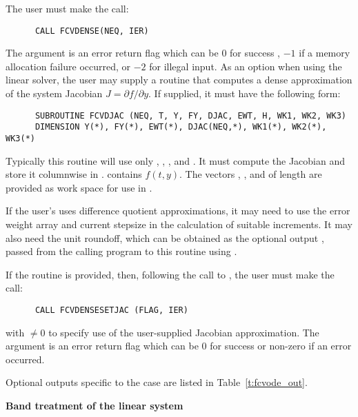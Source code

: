\begin{Steps}
  The user must make the call:
\begin{verbatim}
      CALL FCVDENSE(NEQ, IER)
\end{verbatim}
  The argument  is an error return flag which can be $0$ 
  for success , $-1$ if a memory allocation failure occurred, or $-2$ for illegal
  input.  
  As an option when using the {\dense} linear solver, the user may supply a
  routine that computes a dense approximation of the system Jacobian 
  $J = \partial f / \partial y$. If supplied, it must have the following form:
\begin{verbatim}
      SUBROUTINE FCVDJAC (NEQ, T, Y, FY, DJAC, EWT, H, WK1, WK2, WK3)
      DIMENSION Y(*), FY(*), EWT(*), DJAC(NEQ,*), WK1(*), WK2(*), WK3(*)
\end{verbatim}
  Typically this routine will use only , , , and . 
  It must compute the Jacobian and store it columnwise in .
   contains $f(t,y)$. The vectors , , and 
  of length  are provided as work space for use in .
  
  If the user's  uses difference quotient approximations, it
  may need to use the error weight array  and current stepsize 
  in the calculation of suitable increments.  It may also need the unit
  roundoff, which can be obtained as the optional output ,
  passed from the calling program to this routine using .

  If the  routine is provided, then, 
  following the call to , the user must make the call:
\begin{verbatim}
      CALL FCVDENSESETJAC (FLAG, IER)
\end{verbatim}
  with  $\neq 0$ to specify use of the user-supplied Jacobian approximation.
  The argument  is an error return flag which can be $0$ 
  for success or non-zero if an error occurred.
  
  Optional outputs specific to the {\dense} case are listed in Table~\ref{t:fcvode_out}.


  {\s} {\bf Band treatment of the linear system}
  

\end{Steps}
